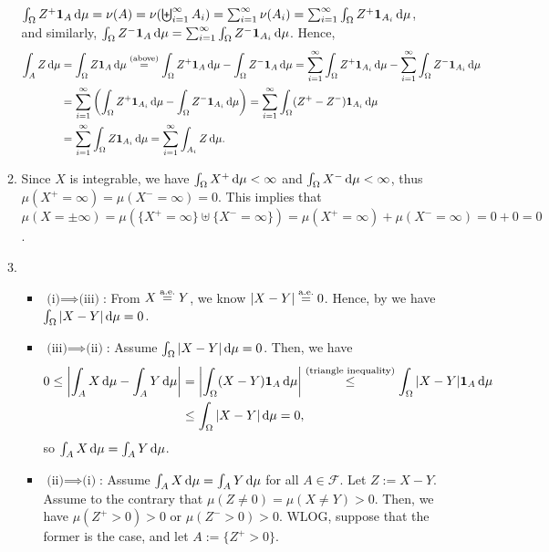 \begin{enumerate}
\begin{pf}
\begin{enumerate}
\(
\int_{\Omega}^{}Z^{+}\indic_{A}\odif{\mu}
=\nu(A)=\nu(\biguplus_{i=1}^{\infty}A_i)
=\sum_{i=1}^{\infty}\nu(A_i)
=\sum_{i=1}^{\infty}\int_{\Omega}^{}Z^{+}\indic_{A_i}\odif{\mu}
\), and similarly,
\(\int_{\Omega}^{}Z^{-}\indic_{A}\odif{\mu}=\sum_{i=1}^{\infty}\int_{\Omega}^{}Z^{-}\indic_{A_i}\odif{\mu}
\). Hence,
\begin{align*}
\int_{A}^{}Z\odif{\mu}
&=\int_{\Omega}^{}Z\indic_{A}\odif{\mu}
\overset{\text{(above)}}{=}
\int_{\Omega}^{}Z^{+}\indic_{A}\odif{\mu}-\int_{\Omega}^{}Z^{-}\indic_{A}\odif{\mu}
=\sum_{i=1}^{\infty}\int_{\Omega}^{}Z^{+}\indic_{A_i}\odif{\mu}
-\sum_{i=1}^{\infty}\int_{\Omega}^{}Z^{-}\indic_{A_i}\odif{\mu} \\
&=\sum_{i=1}^{\infty}\left(\int_{\Omega}^{}Z^{+}\indic_{A_i}\odif{\mu}
-\int_{\Omega}^{}Z^{-}\indic_{A_i}\odif{\mu}\right)
=\sum_{i=1}^{\infty}\int_{\Omega}^{}(Z^{+}-Z^{-})\indic_{A_i}\odif{\mu} \\
&=\sum_{i=1}^{\infty}\int_{\Omega}^{}Z\indic_{A_i}\odif{\mu}
=\sum_{i=1}^{\infty}\int_{A_i}^{}Z\odif{\mu}.
\end{align*}
\item Since \(X\) is integrable, we have
\(\int_{\Omega}^{}X^{+}\odif{\mu}<\infty\) and
\(\int_{\Omega}^{}X^{-}\odif{\mu}<\infty\), thus
\(\mu(X^{+}=\infty)=\mu(X^{-}=\infty)=0\). This implies that
\(\mu(X=\pm\infty)=\mu(\{X^{+}=\infty\}\uplus\{X^{-}=\infty\})
=\mu(X^{+}=\infty)+\mu(X^{-}=\infty)=0+0=0\).
\item 
\begin{itemize}
\item \(\text{(i)}\implies \text{(iii)}\): From \(X\overset{\text{a.e.}}= Y\), we know
\(|X-Y|\overset{\text{a.e.}}= 0\). Hence, by  we have
\(\int_{\Omega}^{}|X-Y|\odif{\mu}=0\).
\item \(\text{(iii)}\implies \text{(ii)}\): Assume
\(\int_{\Omega}^{}|X-Y|\odif{\mu}=0\). Then, we have
\begin{align*}
0\le \left|\int_{A}^{}X\odif{\mu}-\int_{A}^{}Y\odif{\mu}\right|
&=\left|\int_{\Omega}^{}(X-Y)\indic_{A}\odif{\mu}\right|
\overset{\text{(triangle inequality)}}{\le}
\int_{\Omega}^{}|X-Y|\indic_{A}\odif{\mu} \\
&\le\int_{\Omega}^{}|X-Y|\odif{\mu}=0,
\end{align*}
so \(\int_{A}^{}X\odif{\mu}=\int_{A}^{}Y\odif{\mu}\).
\item \(\text{(ii)}\implies \text{(i)}\): Assume
\(\int_{A}^{}X\odif{\mu}=\int_{A}^{}Y\odif{\mu}\) for all \(A\in\mathcal{F}\).
Let \(Z:=X-Y\). Assume to the contrary that \(\mu(Z\ne 0)=\mu(X\ne Y)>0\).
Then, we have \(\mu(Z^{+}>0)>0\) or \(\mu(Z^{-}>0)>0\). WLOG, suppose that
the former is the case, and let \(A:=\{Z^{+}>0\}\).


\end{itemize}
\end{enumerate}
\end{pf}
\end{enumerate}
